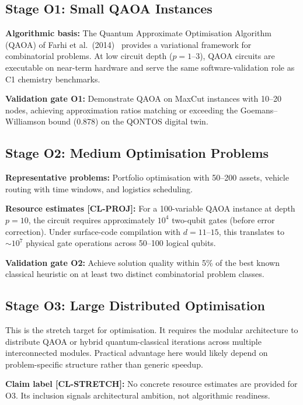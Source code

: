 \documentclass[conference]{IEEEtran}
\begin{document}
\subsection{Stage O1: Small QAOA Instances}

\textbf{Algorithmic basis:} The Quantum Approximate Optimisation Algorithm (QAOA) of Farhi
et al.\ (2014)~\cite{farhi2014} provides a variational framework for combinatorial problems. At low
circuit depth ($p = 1$--$3$), QAOA circuits are executable on near-term hardware and serve
the same software-validation role as C1 chemistry benchmarks.

\textbf{Validation gate O1:} Demonstrate QAOA on MaxCut instances with 10--20 nodes,
achieving approximation ratios matching or exceeding the Goemans--Williamson bound
(0.878) on the QONTOS digital twin.

\subsection{Stage O2: Medium Optimisation Problems}

\textbf{Representative problems:} Portfolio optimisation with 50--200 assets, vehicle
routing with time windows, and logistics scheduling.

\textbf{Resource estimates [CL-PROJ]:} For a 100-variable QAOA instance at depth $p = 10$,
the circuit requires approximately $10^4$ two-qubit gates (before error correction).
Under surface-code compilation with $d = 11$--$15$, this translates to ${\sim}10^7$ physical
gate operations across 50--100 logical qubits.

\textbf{Validation gate O2:} Achieve solution quality within 5\% of the best known classical
heuristic on at least two distinct combinatorial problem classes.

\subsection{Stage O3: Large Distributed Optimisation}

This is the stretch target for optimisation. It requires the modular architecture to
distribute QAOA or hybrid quantum-classical iterations across multiple interconnected
modules. Practical advantage here would likely depend on problem-specific structure
rather than generic speedup.

\textbf{Claim label [CL-STRETCH]:} No concrete resource estimates are provided for O3. Its
inclusion signals architectural ambition, not algorithmic readiness.
\end{document}
